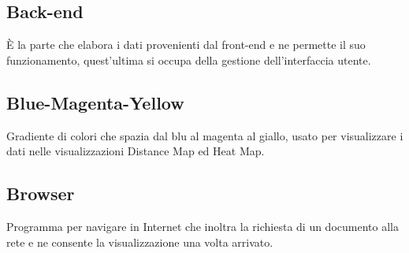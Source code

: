 \documentclass[../glossario.tex]{subfiles}
\begin{document}
\subsection*{Back-end}
È la parte che elabora i dati provenienti dal front-end e ne permette il suo funzionamento, quest'ultima si occupa della gestione dell'interfaccia utente.

\subsection*{Blue-Magenta-Yellow}
Gradiente di colori che spazia dal blu al magenta al giallo, usato per visualizzare i dati nelle visualizzazioni Distance Map ed Heat Map. 

\subsection*{Browser}
Programma per navigare in Internet che inoltra la richiesta di un documento alla rete e ne consente la visualizzazione una volta arrivato.
    
\end{document}
